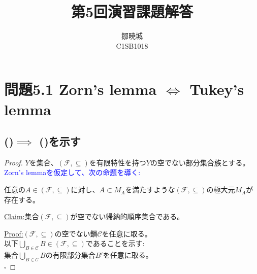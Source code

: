 \documentclass{jreport}
\newenvironment{claim}[1]{\par\noindent\underline{Claim:}\space#1}{}
\newenvironment{claimproof}[1]{\par\noindent\underline{Proof:}\space#1}{\hfill $\square$}
\begin{document}
\title{第5回演習課題解答}
\author{鄒暁城\\ C1SB1018}
\maketitle
\setcounter{chapter}{5}
\newpage
\tableofcontents
{}
\newpage
\section{問題5.1 Zorn's lemma $\Leftrightarrow$ Tukey's lemma}
\subsection{\texorpdfstring{()}\  $\implies$ \texorpdfstring{()} \ を示す}
\begin{proof}
$Y$を集合、$(\mathcal{F} ,\subseteq )$を有限特性を持つ$Y$の空でない部分集合族とする。\\
\textcolor{blue}{Zorn's lemmaを仮定して、次の命題を導く:}\\
\begin{framed}
	任意の$A \in (\mathcal{F},\subseteq )$に対し、$A \subset M_A$を満たすような$(\mathcal{F},\subseteq )$の極大元$M_A$が存在する。\\
\end{framed}
\begin{claim}
	集合$(\mathcal{F},\subseteq )$が空でない帰納的順序集合である。\\
\end{claim}
\begin{claimproof}
	$(\mathcal{F},\subseteq )$の空でない鎖$\mathcal{C}$を任意に取る。\\
	以下$\bigcup\limits_{B \in \mathcal{C}}B \in (\mathcal{F},\subseteq )$であることを示す:\\
	集合$\bigcup\limits_{B \in \mathcal{C}}B$の有限部分集合$B'$を任意に取る。\\

\end{claimproof}
\end{proof}
\end{document}
